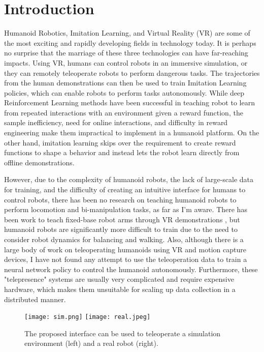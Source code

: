 \chapter{Introduction}


Humanoid Robotics, Imitation Learning, and Virtual Reality (VR) are some of the most exciting and rapidly developing fields in technology today. It is perhaps no surprise that the marriage of these three technologies can have far-reaching impacts. Using VR, humans can control robots in an immersive simulation, or they can remotely teleoperate robots to perform dangerous tasks. The trajectories from the human demonstrations can then be used to train Imitation Learning policies, which can enable robots to perform tasks autonomously. While deep Reinforcement Learning methods have been successful in teaching robot to learn from repeated interactions with an environment given a reward function, the sample inefficiency, need for online interactions, and difficulty in reward engineering make them impractical to implement in a humanoid platform. On the other hand, imitation learning skips over the requirement to create reward functions to shape a behavior and instead lets the robot learn directly from offline demonstrations.

However, due to the complexity of humanoid robots, the lack of large-scale data for training, and the difficulty of creating an intuitive interface for humans to control robots, there has been no research on teaching humanoid robots to perform locomotion and bi-manipulation tasks, as far as I'm aware. There has been work to teach fixed-base robot arms through VR demonstrations \cite{zhang2018deep}, but humanoid robots are significantly more difficult to train due to the need to consider robot dynamics for balancing and walking. Also, although there is a large body of work on teleoperating humanoids using VR and motion capture devices, I have not found any attempt to use the teleoperation data to train a neural network policy to control the humanoid autonomously. Furthermore, these "telepresence" systems are usually very complicated and require expensive hardware, which makes them unsuitable for scaling up data collection in a distributed manner.

\begin{figure}
	\centering
	\texttt{[image: sim.png]}
	\texttt{[image: real.jpeg]}
	\caption{The proposed interface can be used to teleoperate a simulation environment (left) and a real robot (right).}
    \label{fig:simreal}
\end{figure}

